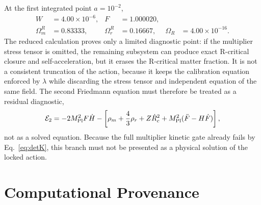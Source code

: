 \documentclass[12pt,a4paper]{article}
\begin{document}
At the first integrated point $a=10^{-2}$,
\begin{align}
W&=4.00\times10^{-6},&F&=1.000020,\nonumber\\
\Omega_m^R&=0.83333,&\Omega_r^R&=0.16667,&\Omega_R&=4.00\times10^{-16}.
\label{eq:locked-early}
\end{align}
The reduced calculation proves only a limited diagnostic point: if the multiplier stress tensor is omitted, the remaining subsystem can produce exact R-critical closure and self-acceleration, but it erases the R-critical matter fraction. It is not a consistent truncation of the action, because it keeps the calibration equation enforced by $\lambda$ while discarding the stress tensor and independent equation of the same field. The second Friedmann equation must therefore be treated as a residual diagnostic,
\begin{equation}
\mathcal E_2=
-2M_{\rm Pl}^2F\dot H
-\left[
\rho_m+\frac43\rho_r+Z\dot R_c^2
+M_{\rm Pl}^2(\ddot F-H\dot F)
\right],
\label{eq:E2residual}
\end{equation}
not as a solved equation. Because the full multiplier kinetic gate already fails by Eq.~\eqref{eq:detK}, this branch must not be presented as a physical solution of the locked action.



\section{Computational Provenance}
\end{document}
